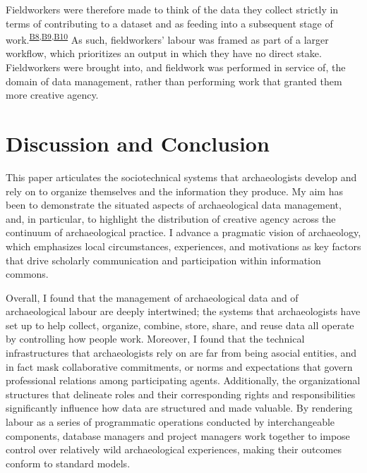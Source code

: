 \documentclass[
]{article}
\begin{document}
Fieldworkers were therefore made to think of the data they collect
strictly in terms of contributing to a dataset and as feeding into a
subsequent stage of
work.\textsuperscript{\hyperref[sec-B8]{B8},\hyperref[sec-B9]{B9},\hyperref[sec-B10]{B10}}
As such, fieldworkers' labour was framed as part of a larger workflow,
which prioritizes an output in which they have no direct stake.
Fieldworkers were brought into, and fieldwork was performed in service
of, the domain of data management, rather than performing work that
granted them more creative agency.

\section{Discussion and Conclusion}\label{discussion-and-conclusion}

This paper articulates the sociotechnical systems that archaeologists
develop and rely on to organize themselves and the information they
produce. My aim has been to demonstrate the situated aspects of
archaeological data management, and, in particular, to highlight the
distribution of creative agency across the continuum of archaeological
practice. I advance a pragmatic vision of archaeology, which emphasizes
local circumstances, experiences, and motivations as key factors that
drive scholarly communication and participation within information
commons.

Overall, I found that the management of archaeological data and of
archaeological labour are deeply intertwined; the systems that
archaeologists have set up to help collect, organize, combine, store,
share, and reuse data all operate by controlling how people work.
Moreover, I found that the technical infrastructures that archaeologists
rely on are far from being asocial entities, and in fact mask
collaborative commitments, or norms and expectations that govern
professional relations among participating agents. Additionally, the
organizational structures that delineate roles and their corresponding
rights and responsibilities significantly influence how data are
structured and made valuable. By rendering labour as a series of
programmatic operations conducted by interchangeable components,
database managers and project managers work together to impose control
over relatively wild archaeological experiences, making their outcomes
conform to standard models.
\end{document}

